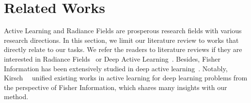 \section{Related Works}
\label{sec:related_works}

\noindent
Active Learning and Radiance Fields are prosperous research fields with various research directions. In this section, we limit our literature review to works that directly relate to our tasks. We refer the readers to literature reviews if they are interested in Radiance Fields~\cite{gao2023nerf-review, dellaert2021neural-review} or Deep Active Learning~\cite{ren2021survey,zhan2022comparative}.
Besides, Fisher Information has been extensively studied in deep active learning~\cite{Ash2021GoneFishing,Ash2020Deep,kothawade2021similar,kirsch2021stochastic}.
Notably, Kirsch~\etal~\cite{kirsch2022unifying} unified existing works in active learning for deep learning problems from the perspective of Fisher Information, which shares many insights with our method. 
